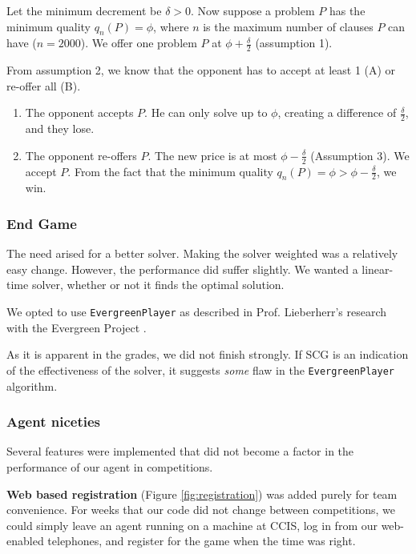 \documentclass[letterpaper,12pt,oneside]{article}
\begin{document}
Let the minimum decrement be $\delta > 0$.
Now suppose a problem $P$ has the minimum quality $q_n(P) = \phi$, where $n$
is the maximum number of clauses $P$ can have ($n = 2000$).
We offer one problem $P$ at $\phi + \frac{\delta}{2}$ (assumption 1).

From assumption 2, we know that the opponent has to accept at least 1 (A)
or re-offer all (B).

\begin{enumerate}
\renewcommand{\labelenumi}{(\Alph{enumi})}
    \item The opponent accepts $P$. He can only solve up to $\phi$,
          creating a difference of $\frac{\delta}{2}$, and they lose.
    \item The opponent re-offers $P$. The new price is at most $\phi -
          \frac{\delta}{2}$ (Assumption 3). We accept $P$. From
          the fact that the minimum quality $q_n(P) = \phi > \phi -
          \frac{\delta}{2}$, we win.
\end{enumerate}

\subsubsection{End Game}

The need arised for a better solver. Making the solver weighted was a
relatively easy change. However, the performance did suffer slightly. We
wanted a linear-time solver, whether or not it finds the optimal solution.

We opted to use {\tt EvergreenPlayer} as described in Prof. Lieberherr's
research with the Evergreen Project \cite{Evergreen:lscs-07}.

As it is apparent in the grades, we did not finish strongly. If SCG is an
indication of the effectiveness of the solver, it suggests {\em some} flaw
in the {\tt EvergreenPlayer} algorithm.

\subsubsection{Agent niceties}

Several features were implemented that did not become a factor in the
performance of our agent in competitions.

\textbf{Web based registration} (Figure \ref{fig:registration}) was added
purely for team convenience. For weeks that our code did not change between
competitions, we could simply leave an agent running on a machine at CCIS, 
log in from our web-enabled telephones, and register for the game when the time was right.
\end{document}
